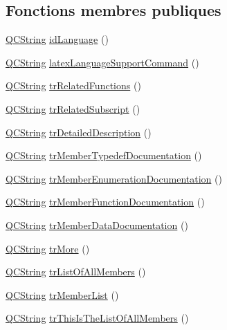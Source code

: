 \subsection*{Fonctions membres publiques}
\begin{DoxyCompactItemize}
\item 
\hyperlink{class_q_c_string}{Q\+C\+String} \hyperlink{class_translator_polish_a75c2e08b70d1be5ca4c1b6f9951def03}{id\+Language} ()
\item 
\hyperlink{class_q_c_string}{Q\+C\+String} \hyperlink{class_translator_polish_ac5c8175efc27b8661a046f601843dec9}{latex\+Language\+Support\+Command} ()
\item 
\hyperlink{class_q_c_string}{Q\+C\+String} \hyperlink{class_translator_polish_a186ac7a8f63b630d82593fc27704df18}{tr\+Related\+Functions} ()
\item 
\hyperlink{class_q_c_string}{Q\+C\+String} \hyperlink{class_translator_polish_a1da09f00d1158c62a529fb714b8a9d5e}{tr\+Related\+Subscript} ()
\item 
\hyperlink{class_q_c_string}{Q\+C\+String} \hyperlink{class_translator_polish_a2d0e5f23e20962482c7750b64af25e52}{tr\+Detailed\+Description} ()
\item 
\hyperlink{class_q_c_string}{Q\+C\+String} \hyperlink{class_translator_polish_a17b66291ed3f31b237865c8061d4fe54}{tr\+Member\+Typedef\+Documentation} ()
\item 
\hyperlink{class_q_c_string}{Q\+C\+String} \hyperlink{class_translator_polish_af2a4dd01a0158ba719c6b438cb654cc7}{tr\+Member\+Enumeration\+Documentation} ()
\item 
\hyperlink{class_q_c_string}{Q\+C\+String} \hyperlink{class_translator_polish_a3d8f160f91ae9317995c9cd3cfabb99e}{tr\+Member\+Function\+Documentation} ()
\item 
\hyperlink{class_q_c_string}{Q\+C\+String} \hyperlink{class_translator_polish_a5ec821f6b6e87f5a446ef18e492aef23}{tr\+Member\+Data\+Documentation} ()
\item 
\hyperlink{class_q_c_string}{Q\+C\+String} \hyperlink{class_translator_polish_ac5bf5b88079d6b285978bdfc679d7ddb}{tr\+More} ()
\item 
\hyperlink{class_q_c_string}{Q\+C\+String} \hyperlink{class_translator_polish_a75a43fcd1a1927285d3cf31c1525bb82}{tr\+List\+Of\+All\+Members} ()
\item 
\hyperlink{class_q_c_string}{Q\+C\+String} \hyperlink{class_translator_polish_aa79fac5e1171b2a5dab0d0464784ebff}{tr\+Member\+List} ()
\item 
\hyperlink{class_q_c_string}{Q\+C\+String} \hyperlink{class_translator_polish_a758732cefd26fb28599e42ca9af87b4e}{tr\+This\+Is\+The\+List\+Of\+All\+Members} ()

\end{DoxyCompactItemize}
